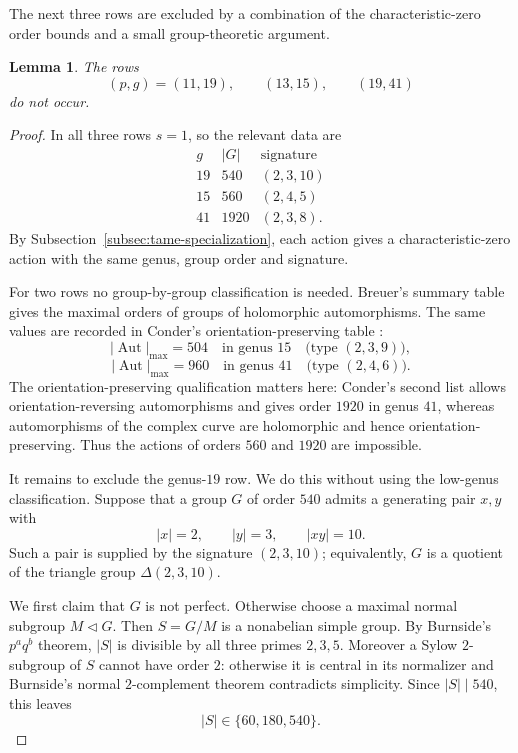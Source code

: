 \documentclass[11pt]{amsart}
\newtheorem{lemma}[theorem]{Lemma}
\theoremstyle{remark}
\newcommand{\Aut}{\operatorname{Aut}}
\begin{document}
The next three rows are excluded by a combination of the
characteristic-zero order bounds and a small group-theoretic argument.

\begin{lemma}\label{lem:triangleexclude}
The rows
\[
(p,g)=(11,19),\qquad (13,15),\qquad (19,41)
\]
do not occur.
\end{lemma}

\begin{proof}
In all three rows $s=1$, so the relevant data are
\[
\begin{array}{c|c|c}
g&|G|&\text{signature}\\ \hline
19&540 &(2,3,10)\\
15&560 &(2,4,5)\\
41&1920&(2,3,8).
\end{array}
\]
By Subsection~\ref{subsec:tame-specialization}, each action gives a
characteristic-zero action with the same genus, group order and signature.

For two rows no group-by-group classification is needed. Breuer's summary
table \cite[p.~91]{Breuer} gives the maximal orders of groups of
holomorphic automorphisms. The same values are recorded in Conder's
orientation-preserving table \cite[Case~A, genera 15 and 41]{ConderMax}:
\[
|\Aut|_{\max}=504\quad\text{in genus }15\quad\text{(type $(2,3,9)$)},
\]
\[
|\Aut|_{\max}=960\quad\text{in genus }41\quad\text{(type $(2,4,6)$)}.
\]
The orientation-preserving qualification matters here: Conder's second
list allows orientation-reversing automorphisms and gives order $1920$
in genus $41$, whereas automorphisms of the complex curve are
holomorphic and hence orientation-preserving. Thus the actions of orders
$560$ and $1920$ are impossible.

It remains to exclude the genus-$19$ row. We do this without using the
low-genus classification. Suppose that a group $G$ of order $540$ admits
a generating pair $x,y$ with
\begin{equation}\label{eq:2310-generators}
|x|=2,\qquad |y|=3,\qquad |xy|=10.
\end{equation}
Such a pair is supplied by the signature $(2,3,10)$; equivalently,
$G$ is a quotient of the triangle group $\Delta(2,3,10)$.

We first claim that $G$ is not perfect. Otherwise choose a maximal normal
subgroup $M\triangleleft G$. Then $S=G/M$ is a nonabelian simple group.
By Burnside's $p^a q^b$ theorem, $|S|$ is divisible by all three primes
$2,3,5$. Moreover a Sylow $2$-subgroup of $S$ cannot have order $2$:
otherwise it is central in its normalizer and Burnside's normal
$2$-complement theorem contradicts simplicity. Since $|S|\mid540$, this
leaves
\[
|S|\in\{60,180,540\}.
\]


\end{proof}
\end{document}
